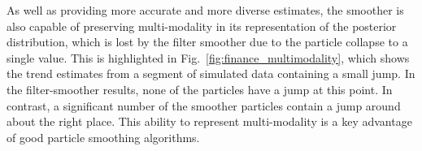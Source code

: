 \documentclass[10pt,twocolumn,twoside]{IEEEtran}
\begin{document}
%
%
%
%
As well as providing more accurate and more diverse estimates, the smoother is also capable of preserving multi-modality in its representation of the posterior distribution, which is lost by the filter smoother due to the particle collapse to a single value. This is highlighted in Fig.~\ref{fig:finance_multimodality}, which shows the trend estimates from a segment of simulated data containing a small jump. In the filter-smoother results, none of the particles have a jump at this point. In contrast, a significant number of the smoother particles contain a jump around about the right place. This ability to represent multi-modality is a key advantage of good particle smoothing algorithms.
%
\end{document}
